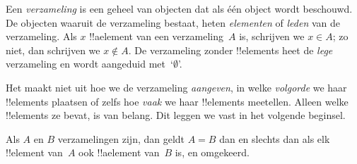 \documentclass[openany]{memoir}
\begin{document}
\begingroup
\def\olfilename{OLP-0004}
\def\olfilepath{content/sets-functions-relations/sets/}
\hypertarget{unit-OLP-0004}{}



\endgroup

\begingroup
\def\olfilename{OLP-0005}
\def\olfilepath{content/sets-functions-relations/sets/}
\hypertarget{unit-OLP-0005}{}




Een \emph{verzameling} is een geheel van objecten dat als één
object wordt beschouwd. De objecten waaruit de verzameling bestaat,
heten \emph{elementen} of \emph{leden} van de verzameling. Als $x$
!!a{element} van een verzameling~$A$ is, schrijven we $x \in A$; zo
niet, dan schrijven we $x \notin A$. De verzameling zonder
!!{element}s heet de \emph{lege} verzameling en wordt
aangeduid met~‘$\emptyset$’.

\begin{explain}
Het maakt niet uit hoe we de verzameling \emph{aangeven}, in welke
\emph{volgorde} we haar !!{element}s plaatsen of zelfs hoe
\emph{vaak} we haar !!{element}s meetellen. Alleen welke
!!{element}s ze bevat, is van belang. Dit leggen we vast in het
volgende beginsel.
\end{explain}

\begin{defn}[Extensionaliteit]
  Als $A$ en $B$ verzamelingen zijn, dan geldt $A = B$ dan en slechts
  dan als elk !!{element} van~$A$ ook !!a{element} van~$B$ is, en
  omgekeerd.
\end{defn}
\end{document}

